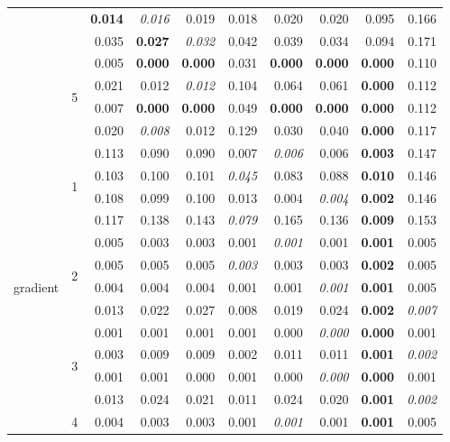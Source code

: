 \documentclass[authoryear, review, 11pt]{elsarticle}
\begin{document}
\begin{table}
\begin{center}
{\begin{tabular}{ccrrrrrrrr}
   &  & \textbf{0.014} & \emph{0.016} & 0.019 & 0.018 & 0.020 & 0.020 & 0.095 & 0.166 \\ 
   &  & 0.035 & \textbf{0.027} & \emph{0.032} & 0.042 & 0.039 & 0.034 & 0.094 & 0.171 \\ 
  \cline{3-10}
   & \multirow{4}{*}{5} & 0.005 & \textbf{0.000} & \textbf{0.000} & 0.031 & \textbf{0.000} & \textbf{0.000} & \textbf{0.000} & 0.110 \\ 
   &  & 0.021 & 0.012 & \emph{0.012} & 0.104 & 0.064 & 0.061 & \textbf{0.000} & 0.112 \\ 
   &  & 0.007 & \textbf{0.000} & \textbf{0.000} & 0.049 & \textbf{0.000} & \textbf{0.000} & \textbf{0.000} & 0.112 \\ 
   &  & 0.020 & \emph{0.008} & 0.012 & 0.129 & 0.030 & 0.040 & \textbf{0.000} & 0.117 \\ 
  \hline
  \multirow{20}{*}{gradient} & \multirow{4}{*}{1} & 0.113 & 0.090 & 0.090 & 0.007 & \emph{0.006} & 0.006 & \textbf{0.003} & 0.147 \\ 
   &  & 0.103 & 0.100 & 0.101 & \emph{0.045} & 0.083 & 0.088 & \textbf{0.010} & 0.146 \\ 
   &  & 0.108 & 0.099 & 0.100 & 0.013 & 0.004 & \emph{0.004} & \textbf{0.002} & 0.146 \\ 
   &  & 0.117 & 0.138 & 0.143 & \emph{0.079} & 0.165 & 0.136 & \textbf{0.009} & 0.153 \\ 
  \cline{3-10}
   & \multirow{4}{*}{2} & 0.005 & 0.003 & 0.003 & 0.001 & \emph{0.001} & 0.001 & \textbf{0.001} & 0.005 \\ 
   &  & 0.005 & 0.005 & 0.005 & \emph{0.003} & 0.003 & 0.003 & \textbf{0.002} & 0.005 \\ 
   &  & 0.004 & 0.004 & 0.004 & 0.001 & 0.001 & \emph{0.001} & \textbf{0.001} & 0.005 \\ 
   &  & 0.013 & 0.022 & 0.027 & 0.008 & 0.019 & 0.024 & \textbf{0.002} & \emph{0.007} \\ 
  \cline{3-10}
   & \multirow{4}{*}{3} & 0.001 & 0.001 & 0.001 & 0.001 & 0.000 & \emph{0.000} & \textbf{0.000} & 0.001 \\ 
   &  & 0.003 & 0.009 & 0.009 & 0.002 & 0.011 & 0.011 & \textbf{0.001} & \emph{0.002} \\ 
   &  & 0.001 & 0.001 & 0.000 & 0.001 & 0.000 & \emph{0.000} & \textbf{0.000} & 0.001 \\ 
   &  & 0.013 & 0.024 & 0.021 & 0.011 & 0.024 & 0.020 & \textbf{0.001} & \emph{0.002} \\ 
  \cline{3-10}
   & \multirow{4}{*}{4} & 0.004 & 0.003 & 0.003 & 0.001 & \emph{0.001} & 0.001 & \textbf{0.001} & 0.005 \\ 

\end{tabular}}
\end{center}
\end{table}
\end{document}
